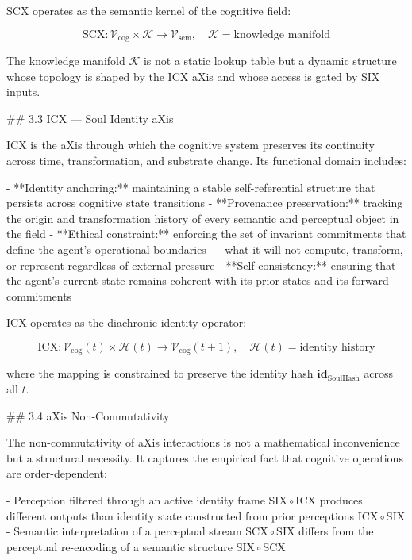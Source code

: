 SCX operates as the semantic kernel of the cognitive field:

\[
\mathrm{SCX}: \mathcal{V}_{\text{cog}} \times \mathcal{K} \rightarrow
\mathcal{V}_{\text{sem}}, \quad \mathcal{K} = \text{knowledge manifold}
\]

The knowledge manifold \(\mathcal{K}\) is not a static lookup table but a dynamic
structure whose topology is shaped by the ICX aXis and whose access is gated by
SIX inputs.

## 3.3 ICX — Soul Identity aXis

ICX is the aXis through which the cognitive system preserves its continuity
across time, transformation, and substrate change. Its functional domain includes:

- **Identity anchoring:** maintaining a stable self-referential structure that
  persists across cognitive state transitions
- **Provenance preservation:** tracking the origin and transformation history of
  every semantic and perceptual object in the field
- **Ethical constraint:** enforcing the set of invariant commitments that define
  the agent's operational boundaries — what it will not compute, transform, or
  represent regardless of external pressure
- **Self-consistency:** ensuring that the agent's current state remains coherent
  with its prior states and its forward commitments

ICX operates as the diachronic identity operator:

\[
\mathrm{ICX}: \mathcal{V}_{\text{cog}}(t) \times \mathcal{H}(t) \rightarrow
\mathcal{V}_{\text{cog}}(t+1), \quad \mathcal{H}(t) = \text{identity history}
\]

where the mapping is constrained to preserve the identity hash
\(\mathbf{id}_{\text{SoulHash}}\) across all \(t\).

## 3.4 aXis Non-Commutativity

The non-commutativity of aXis interactions is not a mathematical inconvenience
but a structural necessity. It captures the empirical fact that cognitive
operations are order-dependent:

- Perception filtered through an active identity frame \(\mathrm{SIX} \circ
  \mathrm{ICX}\) produces different outputs than identity state constructed from
  prior perceptions \(\mathrm{ICX} \circ \mathrm{SIX}\)
- Semantic interpretation of a perceptual stream \(\mathrm{SCX} \circ \mathrm{SIX}\)
  differs from the perceptual re-encoding of a semantic structure \(\mathrm{SIX}
  \circ \mathrm{SCX}\)

